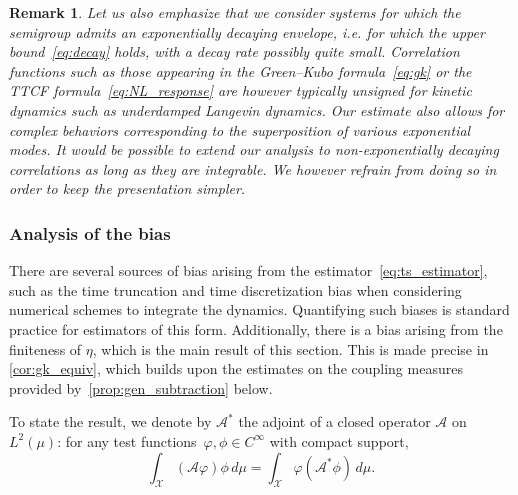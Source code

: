 \documentclass[11pt]{article}
\newtheorem{remark}[theorem]{Remark}
\theoremstyle{definition}
\begin{document}
\begin{remark}
Let us also emphasize that we consider systems for which the semigroup admits an exponentially decaying envelope, \emph{i.e.} for which the upper bound~\eqref{eq:decay} holds, with a decay rate possibly quite small. Correlation functions such as those appearing in the Green--Kubo formula~\eqref{eq:gk} or the TTCF formula~\eqref{eq:NL_response} are however typically unsigned for kinetic dynamics such as underdamped Langevin dynamics. Our estimate also allows for complex behaviors corresponding to the superposition of various exponential modes. It would be possible to extend our analysis to non-exponentially decaying correlations as long as they are integrable. We however refrain from doing so in order to keep the presentation simpler.   
\end{remark}

\subsubsection{Analysis of the bias}
\label{subsubsec:bias_analysis}
There are several sources of bias arising from the estimator~\eqref{eq:ts_estimator}, such as the time truncation and time discretization bias when considering numerical schemes to integrate the dynamics. Quantifying such biases is standard practice for estimators of this form. Additionally, there is a bias arising from the finiteness of $\eta$, which is the main result of this section. This is made precise in \cref{cor:gk_equiv}, which builds upon the estimates on the coupling measures provided by~\cref{prop:gen_subtraction} below. 

To state the result, we denote by $\mathcal{A}^*$ the adjoint of a closed operator $\mathcal{A}$ on $L^2(\mu)$: for any test functions~$\varphi, \phi \in C^\infty$ with compact support,
\begin{equation}
    \int_\mathcal{X} (\mathcal{A}\varphi)\phi \, d\mu = \int_\mathcal{X} \varphi(\mathcal{A}^*\phi) \, d\mu.
    \label{eq:Astar_adjoint}
\end{equation}
\end{document}
